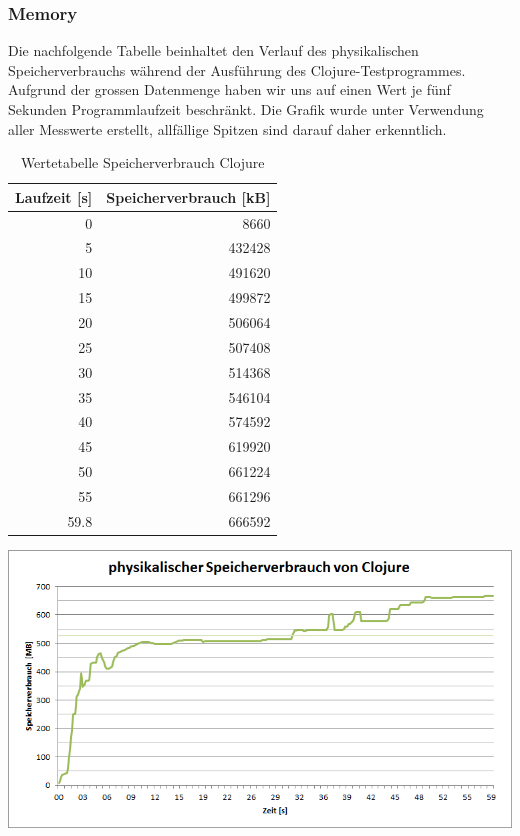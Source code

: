 \documentclass{fancydocument}
\begin{document}
\subsubsection{Memory}
Die nachfolgende Tabelle beinhaltet den Verlauf des physikalischen Speicherverbrauchs während der Ausführung des Clojure-Testprogrammes. Aufgrund der grossen Datenmenge haben wir uns auf einen Wert je fünf Sekunden Programmlaufzeit beschränkt. Die Grafik wurde unter Verwendung aller Messwerte erstellt, allfällige Spitzen sind darauf daher erkenntlich.
\begin{table}[h!]
\centering
\begin{tabular}{|r|r|} \hline
\textbf{Laufzeit [s]} & \textbf{Speicherverbrauch [kB]}\\
\hline
0 & 8660\\
\hline
5 & 432428\\
\hline
10 & 491620\\
\hline
15 & 499872\\
\hline
20 & 506064\\
\hline
25 & 507408\\
\hline
30 & 514368\\
\hline
35 & 546104\\
\hline
40 & 574592\\
\hline
45 & 619920\\
\hline
50 & 661224\\
\hline
55 & 661296\\
\hline
59.8 & 666592\\
\hline
\end{tabular}
\caption{Wertetabelle Speicherverbrauch Clojure}
\end{table}
\begin{center}
\includegraphics[width=\linewidth]{bilder/MemoryClojure.png}
\end{center}
\end{document}

